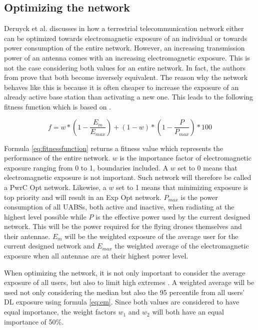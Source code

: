 \documentclass[twocolumn]{phdsymp} %
\begin{document}
\subsection{Optimizing the network}

Deruyck et al. discusses in \cite{J1} how a terrestrial  telecommunication network either can be optimized towards electromagnetic 
exposure of an individual or towards power consumption of the entire network. 
However, an increasing transmission power of an antenna comes with an increasing electromagnetic exposure. This is not the case considering
both values for an entire network. In fact, the authors from \cite{J1}  prove that both become inversely equivalent.
The reason why the network behaves like this is because it is often cheaper to increase the exposure of an already active base station 
than activating a new one. 
This leads to the following fitness function which is based on \cite{J1}.

\begin{equation} 
f = w * \left(1 - \frac{E_m}{E_{max}}\right) + (1 - w)*\left(1 - \frac{P}{P_{max}}\right) * 100
\label{eq:fitnessfunction}
\end{equation}

Formula \ref{eq:fitnessfunction} returns a fitness value which represents the performance of the entire network. 
$w$ is the importance factor of electromagnetic exposure ranging from 0 to 1, boundaries included. A $w$ set to 0 means that electromagnetic 
exposure is not important. Such network will therefore be called a \gls{PwrC Opt} network. 
Likewise, a $w$ set to 1 means that minimizing exposure is top priority and will result in an \gls{Exp Opt} network. $P_{max}$ is the power consumption of all UABSs, 
both active and inactive, when radiating at the highest level possible 
while $P$ is the effective power used by the current designed network. 
This will be the power required for the flying drones themselves and their antennae.
$E_m$ will be the weighted exposure of the average user for the current designed network and $E_{max}$ the weighted average of the electromagnetic exposure when all antennae 
are at their highest power level.

When optimizing the network, it is not only important to consider the average exposure of all users, but also to limit high extremes \cite{J1}. A weighted average 
will be used not only considering the median but also the 95 percentile from all users' \gls{DL} exposure using formula \ref{eq:em}. 
Since both values are considered to have equal importance, the weight factors $w_1$ and $w_2$ will both have an equal importance of 50\%. 
\end{document}
